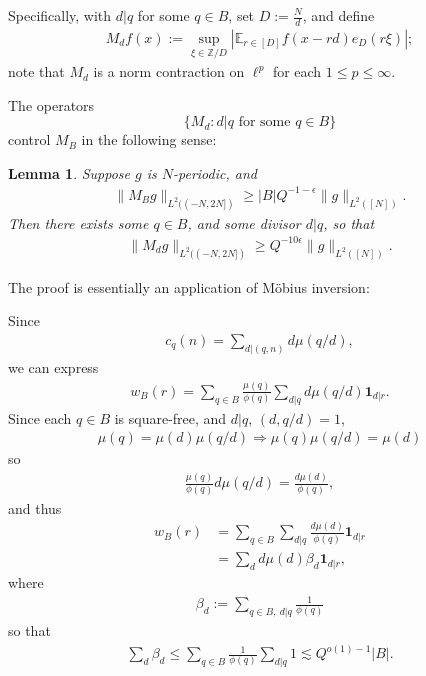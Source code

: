 \documentclass[12pt]{amsart}
\numberwithin{equation}{section}
\newtheorem{lemma}[theorem]{Lemma}
\theoremstyle{definition}
\begin{document}
Specifically, with $d | q$ for some $q \in B$, set $D := \frac{N}{d}$, and define
\begin{align}
    M_d f(x):= \sup_{\xi \in \mathbb{Z}/D} |\mathbb{E}_{r \in [D]} f(x-rd) e_D(r \xi)|;
\end{align}
note that $M_d$ is a norm contraction on $\ell^p$ for each $1 \leq p \leq \infty$.

The operators 
\[ \{ M_d : d | q \text{ for some } q \in B\}\] control $M_B$ in the following sense: 

\begin{lemma}\label{l:MdMB}
    Suppose $g$ is $N$-periodic, and
    \begin{align}
        \| M_B g \|_{L^2( (-N,2N] )} \geq |B| Q^{-1-\epsilon} \| g \|_{L^2([N])}.
    \end{align}
Then there exists some $q \in B$, and some divisor $d|q$, so that
\begin{align}\label{e:Mdlbd}
    \| M_d g \|_{L^2( (-N,2N] )} \geq Q^{-10 \epsilon} \| g \|_{L^2([N])}.
\end{align}   
\end{lemma}
The proof is essentially an application of M\"{o}bius inversion:

Since
\begin{align}
    c_q(n) = \sum_{d|(q,n)} d \mu(q/d),
\end{align}
we can express
\begin{align}
w_B(r) = \sum_{q \in B} \frac{\mu(q)}{\phi(q)} \sum_{d |q } d \mu(q/d) \mathbf{1}_{d |r}.
\end{align}
Since each $q \in B$ is square-free, and $d | q$, $(d,q/d) =1$,
\begin{align}
    \mu(q) = \mu(d) \mu(q/d) \Rightarrow \mu(q) \mu(q/d) = \mu(d)
\end{align}
so
\begin{align}
    \frac{\mu(q)}{\phi(q)} d\mu(q/d) = \frac{d\mu(d)}{\phi(q)},
\end{align}
and thus
\begin{align}
    w_B(r) &= \sum_{q \in B} \sum_{d | q} \frac{d\mu(d)}{\phi(q)} \mathbf{1}_{d |r} \\
    & = \sum_d d \mu(d) \beta_d \mathbf{1}_{d |r},
\end{align}
where
\begin{align}\label{e:betad}
    \beta_d := \sum_{q \in B, \ d | q } \frac{1}{\phi(q)} 
\end{align}
so that
\begin{align}
    \sum_d \beta_d \leq \sum_{q \in B} \frac{1}{\phi(q)} \sum_{d|q} 1 \lesssim Q^{o(1)-1}|B|.
\end{align}
\end{document}
